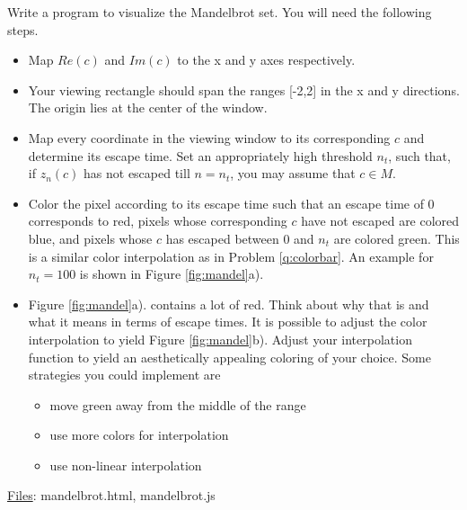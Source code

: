 \documentclass[addpoints]{exam}
\begin{document}
\begin{questions}
Write a program to visualize the Mandelbrot set. You will need the following steps.
\begin{itemize}
\item Map $Re(c)$ and $Im(c)$ to the x and y axes respectively.
\item Your viewing rectangle should span the ranges [-2,2] in the x and y directions. The origin lies at the center of the window.
\item Map every coordinate in the viewing window to its corresponding $c$ and determine its escape time. Set an appropriately high threshold $n_t$, such that, if $z_n(c)$ has not escaped till $n = n_t$, you may assume that $c \in M$.
\item Color the pixel according to its escape time such that an escape time of 0 corresponds to red, pixels whose corresponding $c$ have not escaped are colored blue, and pixels whose $c$ has escaped between 0 and $n_t$ are colored green. This is a similar color interpolation as in Problem \ref{q:colorbar}. An example for $n_t=100$ is shown in Figure \ref{fig:mandel}a).
\item Figure \ref{fig:mandel}a). contains a lot of red. Think about why that is and what it means in terms of escape times. It is possible to adjust the color interpolation to yield Figure \ref{fig:mandel}b). Adjust your interpolation function to yield an aesthetically appealing coloring of your choice. Some strategies you could implement are
  \begin{itemize}
  \item move green away from the middle of the range
  \item use more colors for interpolation
  \item use non-linear interpolation
  \end{itemize}
\end{itemize}
  \noindent\underline{Files}: mandelbrot.html, mandelbrot.js
\end{questions}
\end{document}

